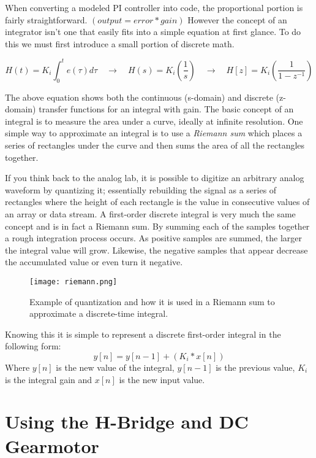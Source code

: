 \documentclass[11pt,fleqn]{book} %
\begin{document}
When converting a modeled PI controller into code, the proportional portion is fairly straightforward. $(output = error * gain)$ However the concept of an integrator isn't one that easily fits into a simple equation at first glance. To do this we must first introduce a small portion of discrete math.

\begin{equation*}
H(t) = K_{i}\int_{0}^{t}e(\tau)d\tau \quad \rightarrow \quad H(s) = K_{i}\left(\frac{1}{s}\right) \quad \rightarrow \quad H[z] = K_{i}\left(\frac{1}{1-z^{-1}}\right)
\end{equation*} 


\noindent The above equation shows both the continuous (s-domain) and discrete (z-domain) transfer functions for an integral with gain. The basic concept of an integral is to measure the area under a curve, ideally at infinite resolution. One simple way to approximate an integral is to use a \textit{Riemann sum} which places a series of rectangles under the curve and then sums the area of all the rectangles together. 

If you think back to the analog lab, it is possible to digitize an arbitrary analog waveform by quantizing it; essentially rebuilding the signal as a series of rectangles where the height of each rectangle is the value in consecutive values of an array or data stream. A first-order discrete integral is very much the same concept and is in fact a Riemann sum. By summing each of the samples together a rough integration process occurs. As positive samples are summed, the larger the integral value will grow. Likewise, the negative samples that appear decrease the accumulated value or even turn it negative. 

\begin{figure}[tb]
    \centering\texttt{[image: riemann.png]}
    \caption{Example of quantization and how it is used in a Riemann sum to approximate a discrete-time integral.}
    \label{riemann}
\end{figure} 

Knowing this it is simple to represent a discrete first-order integral in the following form:
\begin{equation*}
y[n] = y[n-1] + (K_{i} * x[n])
\end{equation*} 
\noindent Where $y[n]$ is the new value of the integral, $y[n-1]$ is the previous value, $K_{i}$ is the integral gain and $x[n]$ is the new input value. 

\section{Using the H-Bridge and DC Gearmotor}
\end{document}
